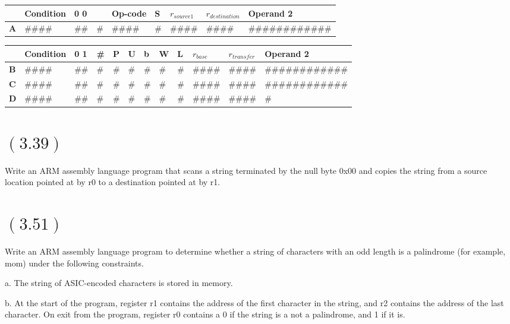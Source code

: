 \documentclass[letterpaper,12pt,titlepage]{article}
\begin{document}
\begin{center}
\begin{tabular}{| l | l | l | l | l | l | l | l | l | }
\hline 
& Condition & 0 0 & & Op-code & S & $r_{source1}$ & $r_{destination}$ & Operand 2 \\
\hline 
\textbf{A}& \#\#\#\# & \#\# & \# & \#\#\#\# &\# & \#\#\#\# &\#\#\#\# & \#\#\#\#\#\#\#\#\#\#\#\#  \\ 
\hline 
\end{tabular}


\begin{tabular}{| l | l | l | l | l | l | l | l | l | l | l | l | }
\hline 
& Condition & 0 1 & \# & P & U & b &W & L & $r_{base}$ & $r_{transfer}$ & Operand 2 \\
\hline
\textbf{B}& \#\#\#\# & \#\# & \# & \# & \# & \# & \# &\# & \#\#\#\# &\#\#\#\# & \#\#\#\#\#\#\#\#\#\#\#\#  \\
\hline
\textbf{C}& \#\#\#\# & \#\# & \# & \# & \# & \# & \# &\# & \#\#\#\# &\#\#\#\# & \#\#\#\#\#\#\#\#\#\#\#\#  \\
\hline
\textbf{D}& \#\#\#\# & \#\# & \# & \# & \# & \# & \# &\# & \#\#\#\# &\#\#\#\# & \#%
\hline
\end{tabular}
\end{center}


\section*{$(3.39)$} Write an ARM assembly language program that scans a string terminated by the null byte 0x00 and copies the string from a source location pointed at by r0 to a destination pointed at by r1.

\section*{$(3.51)$} Write an ARM assembly language program to determine whether a string of characters with an odd length is a palindrome (for example, mom) under the following constraints.

a. The string of ASIC-encoded characters is stored in memory.

b. At the start of the program, register r1 contains the address of the first character in the string, and r2 contains the address of the last character. On exit from the program, register r0 contains a 0 if the string is a not a palindrome, and 1 if it is.



\end{document}
